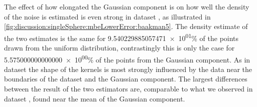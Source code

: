	The effect of how elongated the Gaussian component is on how well the density of the noise is estimated is even strong in dataset \baakmanFive, as illustrated in \cref{fig:discussion:singleSphere:mbeLowerError:baakman5}. The density estimate of the two estimates is the same for \num{9.540229885057471e+01}\% of the points drawn from the uniform distribution, contrastingly this is only the case for \num{5.575000000000000e+00}\% of the points from the Gaussian component. 
	As in dataset \baakmanFour the shape of the kernels is most strongly influenced by the data near the boundaries of the dataset and the Gaussian component.
	The largest differences between the result of the two estimators are, comparable to what we observed in dataset \baakmanFour, found near the mean of the Gaussian component. 

